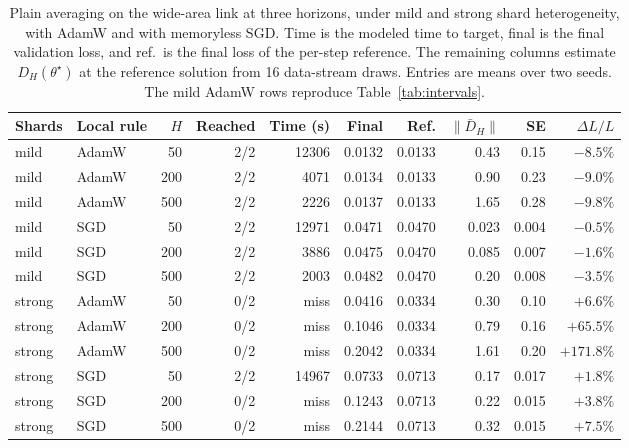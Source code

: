 \documentclass[11pt]{article}
\theoremstyle{definition}
\theoremstyle{remark}
\begin{document}
\begin{table}[h]
\centering
\footnotesize\setlength{\tabcolsep}{3.5pt}
\begin{tabular}{llrrrrrrrr}
\toprule
Shards & Local rule & $H$ & Reached & Time (s) & Final & Ref. & $\|\bar D_H\|$ & SE & $\Delta L/L$\\
\midrule
mild   & AdamW &  50 & 2/2 & 12306 & 0.0132 & 0.0133 & 0.43 & 0.15 & $-8.5\%$\\
mild   & AdamW & 200 & 2/2 &  4071 & 0.0134 & 0.0133 & 0.90 & 0.23 & $-9.0\%$\\
mild   & AdamW & 500 & 2/2 &  2226 & 0.0137 & 0.0133 & 1.65 & 0.28 & $-9.8\%$\\
mild   & SGD   &  50 & 2/2 & 12971 & 0.0471 & 0.0470 & 0.023 & 0.004 & $-0.5\%$\\
mild   & SGD   & 200 & 2/2 &  3886 & 0.0475 & 0.0470 & 0.085 & 0.007 & $-1.6\%$\\
mild   & SGD   & 500 & 2/2 &  2003 & 0.0482 & 0.0470 & 0.20 & 0.008 & $-3.5\%$\\
\midrule
strong & AdamW &  50 & 0/2 &  miss & 0.0416 & 0.0334 & 0.30 & 0.10 & $+6.6\%$\\
strong & AdamW & 200 & 0/2 &  miss & 0.1046 & 0.0334 & 0.79 & 0.16 & $+65.5\%$\\
strong & AdamW & 500 & 0/2 &  miss & 0.2042 & 0.0334 & 1.61 & 0.20 & $+171.8\%$\\
strong & SGD   &  50 & 2/2 & 14967 & 0.0733 & 0.0713 & 0.17 & 0.017 & $+1.8\%$\\
strong & SGD   & 200 & 0/2 &  miss & 0.1243 & 0.0713 & 0.22 & 0.015 & $+3.8\%$\\
strong & SGD   & 500 & 0/2 &  miss & 0.2144 & 0.0713 & 0.32 & 0.015 & $+7.5\%$\\
\bottomrule
\end{tabular}
\caption{Plain averaging on the wide-area link at three horizons, under mild and strong shard heterogeneity, with AdamW and with memoryless SGD. Time is the modeled time to target, final is the final validation loss, and ref.\ is the final loss of the per-step reference. The remaining columns estimate $D_H(\theta^\star)$ at the reference solution from 16 data-stream draws. Entries are means over two seeds. The mild AdamW rows reproduce Table~\ref{tab:intervals}.}
\label{tab:diag}
\end{table}
\end{document}
